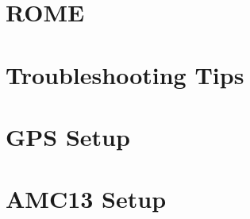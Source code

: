 

\chapter{ROME}



\chapter{Troubleshooting Tips}



\appendix

\chapter{GPS Setup}



\chapter{AMC13 Setup}




